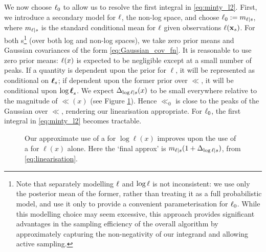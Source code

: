 \documentclass{article} %
\newcommand{\De}{\Delta_{\ll|s}}
\begin{document}
We now choose $\lfn_0$ to allow us to resolve the first integral in \eqref{eq:minty_l2}. First, we introduce a secondary \gpb model for $\lfn$, the non-log space, and choose $\lfn_0 \deq  m_{\lfn|s}$, where $m_{\lfn|s}$ is the standard \gpb conditional mean for $\lfn$ given observations $\lfn(\vlfv_s)$. For both \gp s\footnote{Note that separately modelling $\lfn$ and $\log \lfn$ is not inconsistent: we use only the posterior mean of the former, rather than treating it as a full probabilistic model, and use it only to provide a convenient parameterisation for $\lfn_0$. While this modelling choice may seem excessive, this approach provides significant advantages in the  sampling efficiency of the overall algorithm by approximately capturing the non-negativity of our integrand and allowing active sampling.} 
(over both log and non-log spaces), we take zero prior means and Gaussian
covariances of the form \eqref{eq:Gaussian_cov_fn}. It is reasonable to use zero prior means: $\lfn(\lfv)$ is expected to be negligible except at a small number of peaks. If a quantity is dependent upon the \gpb prior for $\ell$, it will be represented as conditional on $\vl_s$; if dependent upon the former \gpb prior over $\ll$, it will be conditional upon $\vll_s$.
We expect $\De(\lfv)$ to be small everywhere relative to the magnitude of $\ll(x)$ (see Figure \ref{fig:delta}). Hence
 $\ll_0$ is close to the peaks of the Gaussian over $\ll$, rendering our linearisation appropriate. For $\lfn_0$, the first integral in \eqref{eq:minty_l2} becomes tractable.
\begin{figure}
\centering
{}
\caption{Our approximate use of a \gpb for $\log \ell (x)$ improves upon the use of a \gpb for $\ell(x)$ alone. 
Here the `final approx' is $m_{\lfn|s} (1 + \De)$, from \eqref{eq:linearisation}.
}
\label{fig:delta}
\end{figure}
\end{document}
